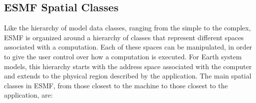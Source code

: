 \subsection{ESMF Spatial Classes}
\label{sec:spatialclasses}

Like the hierarchy of model data classes, ranging from the 
simple to the complex, ESMF is organized around a hierarchy of
classes that represent different spaces associated with a computation.
Each of these spaces can be manipulated, in order to give
the user control over how a computation is executed.  For Earth system
models, this hierarchy starts with the address space associated
with the computer and extends to the physical region described by
the application.   The main spatial classes in ESMF, from
those closest to the machine to those closest to the application, are:

